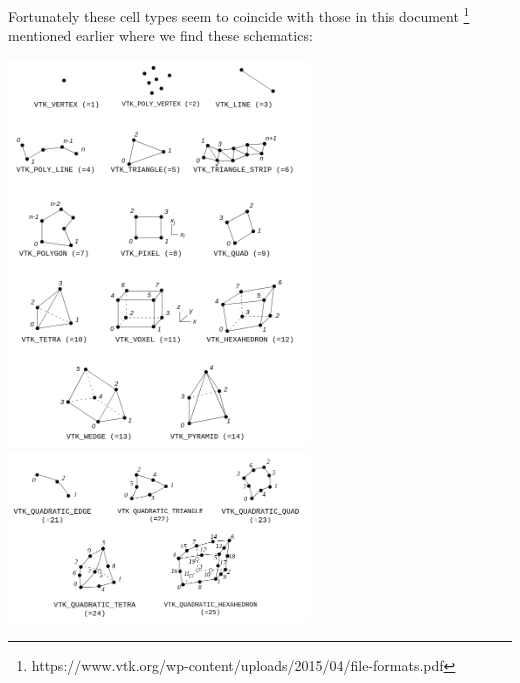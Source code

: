 Fortunately these cell types seem to coincide with those in this document
\footnote{https://www.vtk.org/wp-content/uploads/2015/04/file-formats.pdf}
mentioned earlier where we find these schematics:

\begin{center}
\includegraphics[width=8cm]{images/vtk/types1}
\includegraphics[width=8cm]{images/vtk/types2}
\end{center}








